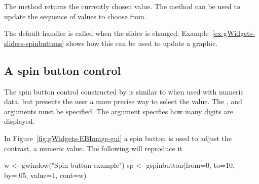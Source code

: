 The  method returns the currently chosen
value. The \method{[\ASSIGN}{gslider} method can be used to update the
sequence of values to choose from. 

The default handler is called when the slider is changed. Example~\ref{ex-gWidgets-sliders-spinbuttons}
shows how this can be used to update a graphic.


\subsection{A spin button control}
\label{sec:gWidgets-spin-button-control}

The spin button control constructed by  is
similar to  when used with numeric data, but
presents the user a more precise way to select the value. The
,  and  arguments must be specified. The
argument  specifies how many digits are
displayed.

In Figure~\ref{fig:gWidgets-EBImage-gui} a spin button is used to
adjust the contrast, a numeric value. The following will reproduce it

\begin{Schunk}
\begin{Sinput}
 w <- gwindow("Spin button example")
 sp <- gspinbutton(from=0, to=10, by=.05, value=1, cont=w)
\end{Sinput}
\end{Schunk}







